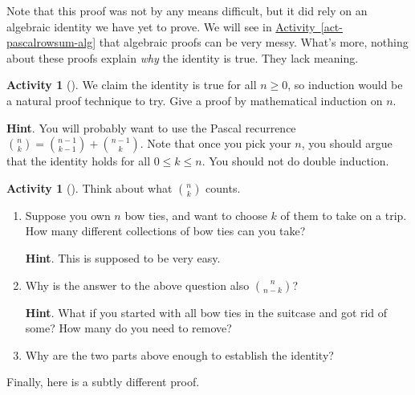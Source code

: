 \documentclass[10pt,]{book}
\theoremstyle{plain}
\theoremstyle{definition}
\theoremstyle{definition}
\theoremstyle{definition}
\newtheorem{activity}[project]{Activity}
\numberwithin{equation}{chapter}
\begin{document}
\hypertarget{p-556}{}%
Note that this proof was not by any means difficult, but it did rely on an algebraic identity we have yet to prove.  We will see in \hyperref[act-pascalrowsum-alg]{Activity~\ref{act-pascalrowsum-alg}} that algebraic proofs can be very messy.  What's more, nothing about these proofs explain \emph{why} the identity is true.  They lack meaning.%
\begin{activity}[]\label{activity-66}
\hypertarget{p-557}{}%
We claim the identity is true for all \(n \ge 0\), so induction would be a natural proof technique to try.  Give a proof by mathematical induction on \(n\).%
\par\smallskip%
\noindent\textbf{Hint}.\hypertarget{hint-28}{}\quad%
\hypertarget{p-558}{}%
You will probably want to use the Pascal recurrence \(\binom{n}{k} = \binom{n-1}{k-1} + \binom{n-1}{k}\).  Note that once you pick your \(n\), you should argue that the identity holds for all \(0 \le k \le n\).  You should not do double induction.%
\end{activity}
\begin{activity}[]\label{act-pascalsym-dc}
\hypertarget{p-559}{}%
Think about what \(\binom{n}{k}\) counts.%
\begin{enumerate}[font=\bfseries,label=(\alph*),ref=\alph*]
\item\label{task-102} \hypertarget{p-560}{}%
Suppose you own \(n\) bow ties, and want to choose \(k\) of them to take on a trip.  How many different collections of bow ties can you take?%
\par\smallskip%
\noindent\textbf{Hint}.\hypertarget{hint-29}{}\quad%
\hypertarget{p-561}{}%
This is supposed to be very easy.%
\item\label{task-103} \hypertarget{p-562}{}%
Why is the answer to the above question also \(\binom{n}{n-k}\)?%
\par\smallskip%
\noindent\textbf{Hint}.\hypertarget{hint-30}{}\quad%
\hypertarget{p-563}{}%
What if you started with all bow ties in the suitcase and got rid of some?  How many do you need to remove?%
\item\label{task-104} \hypertarget{p-564}{}%
Why are the two parts above enough to establish the identity?%
\end{enumerate}
\end{activity}
\hypertarget{p-565}{}%
Finally, here is a subtly different proof.%
\end{document}
